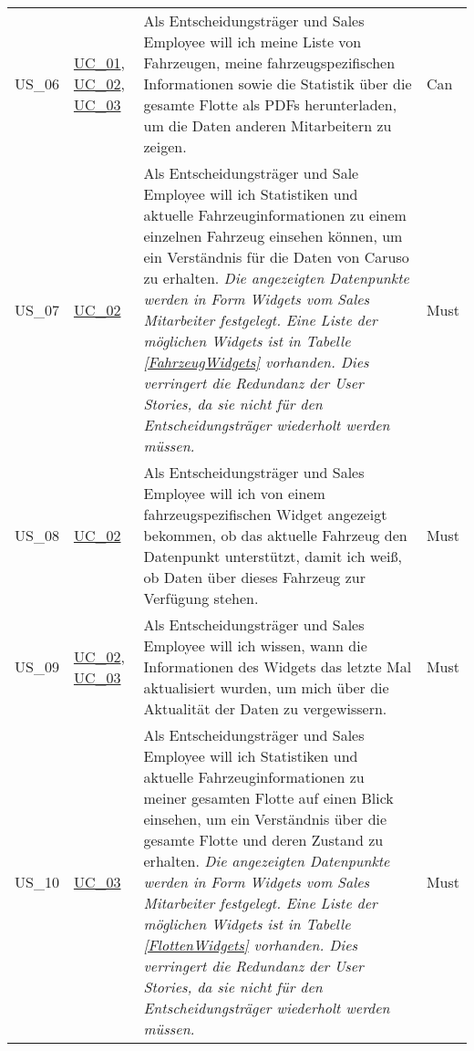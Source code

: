 \begin{footnotesize}
\begin{longtable}[L L L L]{ p{} p{} p{} p{}}
      \hypertarget{Ref:US6}{US\_06} & \hyperlink{Ref:UC1}{UC\_01}, \newline \hyperlink{Ref:UC2}{UC\_02}, \newline \hyperlink{Ref:UC3}{UC\_03} & Als Entscheidungsträger und Sales Employee will ich meine Liste von Fahrzeugen, meine fahrzeugspezifischen Informationen sowie die Statistik über die gesamte Flotte als PDFs herunterladen, um die Daten anderen Mitarbeitern zu zeigen. & Can \\

      \hypertarget{Ref:US7}{US\_07} & \hyperlink{Ref:UC2}{UC\_02} & Als Entscheidungsträger und Sale Employee will ich Statistiken und aktuelle Fahrzeuginformationen zu einem einzelnen Fahrzeug einsehen können, um ein Verständnis für die Daten von Caruso zu erhalten. 
      \newline\newline
      \emph{Die angezeigten Datenpunkte werden in Form Widgets vom Sales Mitarbeiter festgelegt. Eine Liste der möglichen Widgets ist in Tabelle \ref{FahrzeugWidgets} vorhanden. Dies verringert die Redundanz der User Stories, da sie nicht für den Entscheidungsträger wiederholt werden müssen.}
      & Must \\

      \hypertarget{Ref:US8}{US\_08} & \hyperlink{Ref:UC2}{UC\_02} & Als Entscheidungsträger und Sales Employee will ich von einem fahrzeugspezifischen Widget angezeigt bekommen, ob das aktuelle Fahrzeug den Datenpunkt unterstützt, damit ich weiß, ob Daten über dieses Fahrzeug zur Verfügung stehen.
      & Must
      \\

      \hypertarget{Ref:US9}{US\_09} & \hyperlink{Ref:UC2}{UC\_02}, \newline \hyperlink{Ref:UC3}{UC\_03} & Als Entscheidungsträger und Sales Employee will ich wissen, wann die Informationen des Widgets das letzte Mal aktualisiert wurden, um mich über die Aktualität der Daten zu vergewissern.
      & Must
      \\

      \hypertarget{Ref:US10}{US\_10} & \hyperlink{Ref:UC3}{UC\_03} & Als Entscheidungsträger und Sales Employee will ich Statistiken und aktuelle Fahrzeuginformationen zu meiner gesamten Flotte auf einen Blick einsehen, um ein Verständnis über die gesamte Flotte und deren Zustand zu erhalten.
      \newline\newline
      \emph{Die angezeigten Datenpunkte werden in Form Widgets vom Sales Mitarbeiter festgelegt. Eine Liste der möglichen Widgets ist in Tabelle \ref{FlottenWidgets} vorhanden. Dies verringert die Redundanz der User Stories, da sie nicht für den Entscheidungsträger wiederholt werden müssen.} & Must \\


\end{longtable}
\end{footnotesize}
